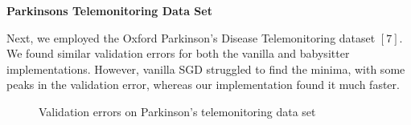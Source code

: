 \documentclass{article}
\begin{document}
\textbf{Parkinsons Telemonitoring Data Set}
\par Next, we employed the Oxford Parkinson's Disease Telemonitoring dataset $ [7] $. We found similar validation errors for both the vanilla and babysitter implementations. However, vanilla SGD struggled to find the minima, with some peaks in the validation error, whereas our implementation found it much faster.
\begin{figure}[H]
	\centering
	\quad
	\caption{Validation errors on Parkinson's telemonitoring data set}%
	\label{Parkinsons}%
\end{figure}
\end{document}
